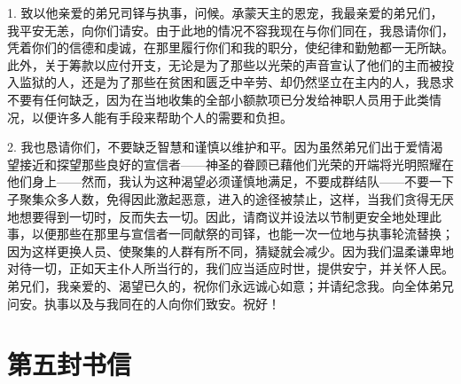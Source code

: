 \par

\par

1. 致以他亲爱的弟兄司铎与执事，问候。承蒙天主的恩宠，我最亲爱的弟兄们，我平安无恙，向你们请安。由于此地的情况不容我现在与你们同在，我恳请你们，凭着你们的信德和虔诚，在那里履行你们和我的职分，使纪律和勤勉都一无所缺。此外，关于筹款以应付开支，无论是为了那些以光荣的声音宣认了他们的主而被投入监狱的人，还是为了那些在贫困和匮乏中辛劳、却仍然坚立在主内的人，我恳求不要有任何缺乏，因为在当地收集的全部小额款项已分发给神职人员用于此类情况，以便许多人能有手段来帮助个人的需要和负担。\par

2. 我也恳请你们，不要缺乏智慧和谨慎以维护和平。因为虽然弟兄们出于爱情渴望接近和探望那些良好的宣信者——神圣的眷顾已藉他们光荣的开端将光明照耀在他们身上——然而，我认为这种渴望必须谨慎地满足，不要成群结队——不要一下子聚集众多人数，免得因此激起恶意，进入的途径被禁止，这样，当我们贪得无厌地想要得到一切时，反而失去一切。因此，请商议并设法以节制更安全地处理此事，以便那些在那里与宣信者一同献祭的司铎，也能一次一位地与执事轮流替换；因为这样更换人员、使聚集的人群有所不同，猜疑就会减少。因为我们温柔谦卑地对待一切，正如天主仆人所当行的，我们应当适应时世，提供安宁，并关怀人民。弟兄们，我亲爱的、渴望已久的，祝你们永远诚心如意；并请纪念我。向全体弟兄问安。执事以及与我同在的人向你们致安。祝好！\par



\section{第五封书信}

\par

\par

